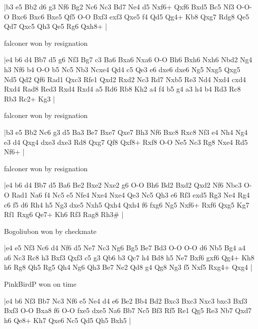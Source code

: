 \makegametitle
|b3 e5 Bb2 d6 g3 Nf6 Bg2 Nc6 Nc3 Bd7 Ne4 d5 Nxf6+ Qxf6 Bxd5 Bc5 Nf3 O-O-O Bxc6 Bxc6 Bxe5 Qf5 O-O Bxf3 exf3 Qxe5 f4 Qd5 Qg4+ Kb8 Qxg7 Rdg8 Qe5 Qd7 Qxc5 Qh3 Qe5 Rg6 Qxh8+  |

\showboard

falconer won by resignation

\makegametitle
|e4 b6 d4 Bb7 d5 g6 Nf3 Bg7 c3 Ba6 Bxa6 Nxa6 O-O Bh6 Bxh6 Nxh6 Nbd2 Ng4 h3 Nf6 b4 O-O b5 Nc5 Nb3 Ncxe4 Qd4 c5 Qe3 e6 dxe6 dxe6 Ng5 Nxg5 Qxg5 Nd5 Qd2 Qf6 Rad1 Qxc3 Rfe1 Qxd2 Rxd2 Nc3 Rd7 Nxb5 Re3 Nd4 Nxd4 cxd4 Rxd4 Rad8 Red3 Rxd4 Rxd4 a5 Rd6 Rb8 Kh2 a4 f4 b5 g4 a3 h4 b4 Rd3 Rc8 Rb3 Rc2+ Kg3  |

\showboard

falconer won by resignation

\makegametitle
|b3 e5 Bb2 Nc6 g3 d5 Ba3 Be7 Bxe7 Qxe7 Bh3 Nf6 Bxc8 Rxc8 Nf3 e4 Nh4 Ng4 e3 d4 Qxg4 dxe3 dxe3 Rd8 Qxg7 Qf8 Qxf8+ Rxf8 O-O Ne5 Nc3 Rg8 Nxe4 Rd5 Nf6+  |

\showboard

falconer won by resignation

\makegametitle
|e4 b6 d4 Bb7 d5 Ba6 Be2 Bxe2 Nxe2 g6 O-O Bh6 Bd2 Bxd2 Qxd2 Nf6 Nbc3 O-O Rad1 Na6 f4 Nc5 e5 Nfe4 Nxe4 Nxe4 Qe3 Nc5 Qh3 e6 Rf3 exd5 Rg3 Ne4 Rg4 c6 f5 d6 Rh4 h5 Ng3 dxe5 Nxh5 Qxh4 Qxh4 f6 fxg6 Ng5 Nxf6+ Rxf6 Qxg5 Kg7 Rf1 Rxg6 Qe7+ Kh6 Rf3 Rag8 Rh3\#  |

\showboard

Bogoliubon won by checkmate

\makegametitle
|e4 e5 Nf3 Nc6 d4 Nf6 d5 Ne7 Nc3 Ng6 Bg5 Be7 Bd3 O-O O-O d6 Nb5 Bg4 a4 a6 Nc3 Rc8 h3 Bxf3 Qxf3 c5 g3 Qb6 b3 Qc7 h4 Bd8 h5 Ne7 Bxf6 gxf6 Qg4+ Kh8 h6 Rg8 Qh5 Rg5 Qh4 Ng6 Qh3 Be7 Ne2 Qd8 g4 Qg8 Ng3 f5 Nxf5 Rxg4+ Qxg4  |

\showboard

PinkBirdP won on time

\makegametitle
|e4 b6 Nf3 Bb7 Nc3 Nf6 e5 Ne4 d4 e6 Be2 Bb4 Bd2 Bxc3 Bxc3 Nxc3 bxc3 Bxf3 Bxf3 O-O Bxa8 f6 O-O fxe5 dxe5 Na6 Bb7 Nc5 Bf3 Rf5 Re1 Qg5 Re3 Nb7 Qxd7 h6 Qe8+ Kh7 Qxe6 Nc5 Qd5 Qh5 Bxh5  |


